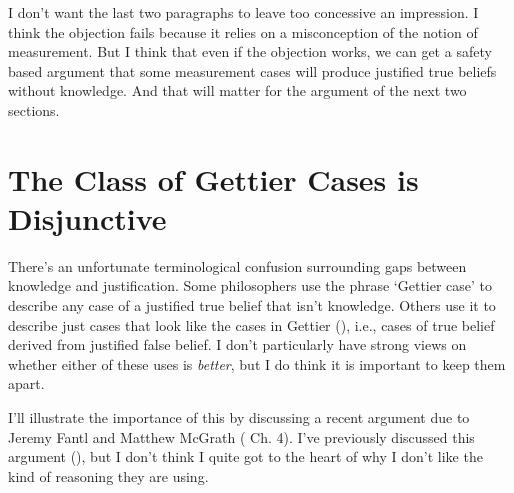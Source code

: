 \documentclass[
  10pt,
  letterpaper,
  DIV=11,
  numbers=noendperiod,
  twoside]{scrartcl}
\begin{document}
I don't want the last two paragraphs to leave too concessive an
impression. I think the objection fails because it relies on a
misconception of the notion of measurement. But I think that even if the
objection works, we can get a safety based argument that some
measurement cases will produce justified true beliefs without knowledge.
And that will matter for the argument of the next two sections.

\section{The Class of Gettier Cases is
Disjunctive}\label{the-class-of-gettier-cases-is-disjunctive}

There's an unfortunate terminological confusion surrounding gaps between
knowledge and justification. Some philosophers use the phrase `Gettier
case' to describe any case of a justified true belief that isn't
knowledge. Others use it to describe just cases that look like the cases
in Gettier (), i.e., cases of true
belief derived from justified false belief. I don't particularly have
strong views on whether either of these uses is \emph{better}, but I do
think it is important to keep them apart.

I'll illustrate the importance of this by discussing a recent argument
due to Jeremy Fantl and Matthew McGrath
( Ch. 4). I've
previously discussed this argument
(), but I don't
think I quite got to the heart of why I don't like the kind of reasoning
they are using.
\end{document}
